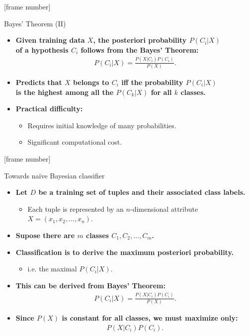 \documentclass[aspectratio=169,t,table]{beamer}
\begin{document}
  {
    [frame number]
    \begin{frame}{Bayes' Theorem (II)}
        \begin{itemize}
          \item \textbf{Given training data $X$, the posteriori probability $P(C_i|X)$\\
           of a hypothesis $C_i$ follows from the Bayes' Theorem:}
           \begin{align}
             P(C_i|X) = \frac{P(X|C_i)P(C_i)}{P(X)}.
           \end{align}
          \item \textbf{Predicts that $X$ belongs to $C_i$ iff the probability $P(C_i|X)$\\
           is {\color{airforceblue}the highest} among all the $P(C_k|X)$ for all $k$ classes.}
           \item \textbf{Practical difficulty:}
           \begin{itemize}
             \item Requires initial knowledge of many probabilities.
             \item Significant computational cost.
           \end{itemize}
        \end{itemize}
    \end{frame}
  }

  {
    [frame number]
    \begin{frame}{Towards naïve Bayesian classifier}
        \begin{itemize}
          \item \textbf{Let $D$ be a training set of tuples and their associated class labels.}
          \begin{itemize}
            \item Each tuple is represented by an $n$-dimensional attribute $X = (x_1,x_2,\ldots,x_n)$.
          \end{itemize}
          \item \textbf{Supose there are $m$ classes $C_1,C_2, \ldots, C_m$.}
          \item \textbf{Classification is to derive the {\color{airforceblue}maximum posteriori probability}.}
          \begin{itemize}
            \item i.e. the maximal $P(C_i|X)$.
          \end{itemize}
          \item \textbf{This can be derived from Bayes' Theorem:}
          \begin{align}
            P(C_i|X) = \frac{P(X|C_i)P(C_i)}{P(X)}.
          \end{align}
          \item \textbf{Since $P(X)$ is constant for all classes, we must maximize only:}
          \begin{align}
            P(X|C_i)P(C_i).
          \end{align}
        \end{itemize}
    \end{frame}
  }
\end{document}
